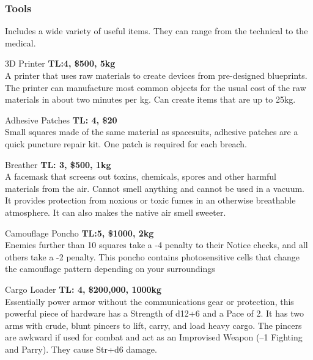 \subsubsection{Tools}

Includes a wide variety of useful items. They can range from the technical to the medical.

\begin{genericsection}{3D Printer}
\textbf{TL:4, \$500, 5kg}\\
A printer that uses raw materials to create devices from pre-designed blueprints. The printer can manufacture most common objects for the usual cost of the raw materials in about two minutes per kg. Can create items that are up to 25kg.
\end{genericsection}

\begin{genericsection}{Adhesive Patches}
\textbf{TL: 4, \$20}\\
Small squares made of the same material as spacesuits, adhesive patches are a quick puncture repair kit. One patch is required for each breach.
\end{genericsection}

\begin{genericsection}{Breather}
\textbf{TL: 3, \$500, 1kg}\\
A facemask that screens out toxins, chemicals, spores and other harmful materials from the air. Cannot smell anything and cannot be used in a vacuum.	It provides protection from noxious or toxic fumes in an otherwise breathable atmosphere. It can also makes the native air smell sweeter.
\end{genericsection}

\begin{genericsection}{Camouflage Poncho}
\textbf{TL:5, \$1000, 2kg}\\
Enemies further than 10 squares take a -4 penalty to their Notice checks, and all others take a -2 penalty. This poncho contains photosensitive cells that change the camouflage pattern depending on your surroundings
\end{genericsection}

\begin{genericsection}{Cargo Loader}
\textbf{TL: 4, \$200,000, 1000kg}\\
Essentially power armor without the communications gear or protection, this powerful piece of hardware has a Strength of d12+6 and a Pace of 2. It has two arms with crude, blunt pincers to lift, carry, and load heavy cargo. The pincers are awkward if used for combat and act as an Improvised Weapon (–1 Fighting and Parry). They cause Str+d6 damage.
\end{genericsection}

